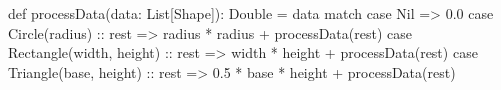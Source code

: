 def processData(data: List[Shape]): Double = data match {
  case Nil => 0.0
  case Circle(radius) :: rest => radius * radius + processData(rest)
  case Rectangle(width, height) :: rest => width * height + processData(rest)
  case Triangle(base, height) :: rest => 0.5 * base * height + processData(rest)
}